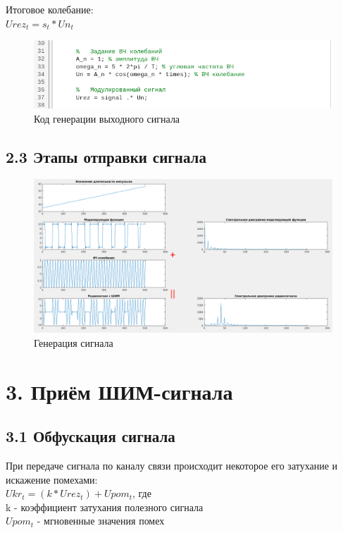 \documentclass[12pt]{article}
\begin{document}
  	Итоговое колебание:\\
  	$Urez_t = s_t * Un_t$\\
  	
  	\begin{figure}[!h]
		\centering
		\includegraphics[width=\linewidth]{code_PW.png}
		\caption{Код генерации выходного сигнала}
	\end{figure}
 	
  \subsection*{2.3 Этапы отправки сигнала}
	\begin{figure}[!h]
		\centering
		\includegraphics[width=\linewidth]{graph_output_colored.png}
		\caption{Генерация сигнала}
	\end{figure}

 
\newpage
 \section*{3. Приём ШИМ-сигнала}
 
  \subsection*{3.1 Обфускация сигнала}
  При передаче сигнала по каналу связи происходит некоторое его затухание и искажение помехами:\\
  $Ukr_t = (k * Urez_t) + Upom_t$, где \\
  k - коэффициент затухания полезного сигнала\\
  $Upom_t$ - мгновенные значения помех \\
  
\end{document}
